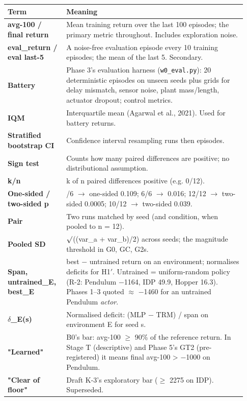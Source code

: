 \documentclass[11pt]{article}
\begin{document}
\begin{center}\small\begin{tabular}{>{\raggedright\arraybackslash}p{0.217\linewidth}>{\raggedright\arraybackslash}p{0.717\linewidth}}
\toprule
Term & Meaning \\
\midrule
\textbf{avg-100 / final return} & Mean training return over the last 100 episodes; the primary metric throughout. Includes exploration noise. \\
\textbf{eval\_return / eval last-5} & A noise-free evaluation episode every 10 training episodes; the mean of the last 5. Secondary. \\
\textbf{Battery} & Phase 3's evaluation harness (\texttt{w0\_eval.py}): 20 deterministic episodes on unseen seeds plus grids for delay mismatch, sensor noise, plant mass/length, actuator dropout; control metrics. \\
\textbf{IQM} & Interquartile mean (Agarwal et al., 2021). Used for battery returns. \\
\textbf{Stratified bootstrap CI} & Confidence interval resampling runs then episodes. \\
\textbf{Sign test} & Counts how many paired differences are positive; no distributional assumption. \\
\textbf{k/n} & k of n paired differences positive (e.g. 0/12). \\
\textbf{One-sided / two-sided p} & 5/6 $\rightarrow$ one-sided 0.109; 6/6 $\rightarrow$ 0.016; 12/12 $\rightarrow$ two-sided 0.0005; 10/12 $\rightarrow$ two-sided 0.039. \\
\textbf{Pair} & Two runs matched by seed (and condition, when pooled to n = 12). \\
\textbf{Pooled SD} & $\surd$((var\_a + var\_b)/2) across seeds; the magnitude threshold in G0, GC, G2s. \\
\textbf{Span, untrained\_E, best\_E} & best $-$ untrained return on an environment; normalises deficits for H1$'$. Untrained = uniform-random policy (R-2: Pendulum $-$1164, IDP 49.9, Hopper 16.3). Phases 1--3 quoted $\approx$ $-$1460 for an untrained Pendulum \emph{actor}. \\
\textbf{$\delta$\_E(s)} & Normalised deficit: (MLP $-$ TRM) / span on environment E for seed s. \\
\textbf{"Learned"} & B0's bar: avg-100 $\geq$ 90\% of the reference return. In Stage T (descriptive) and Phase 5's GT2 (pre-registered) it means final avg-100 > $-$1000 on Pendulum. \\
\textbf{"Clear of floor"} & Draft K-3's exploratory bar ($\geq$ 2275 on IDP). Superseded. \\

\end{tabular}
\end{center}
\end{document}
